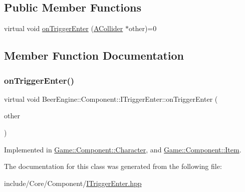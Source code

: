 \subsection*{Public Member Functions}
\begin{DoxyCompactItemize}
\item 
virtual void \mbox{\hyperlink{class_beer_engine_1_1_component_1_1_i_trigger_enter_aab0d007cc2a256bc5aa542cd7dfdeef0}{on\+Trigger\+Enter}} (\mbox{\hyperlink{class_beer_engine_1_1_component_1_1_a_collider}{A\+Collider}} $\ast$other)=0
\end{DoxyCompactItemize}


\subsection{Member Function Documentation}
\mbox{\label{class_beer_engine_1_1_component_1_1_i_trigger_enter_aab0d007cc2a256bc5aa542cd7dfdeef0}} 
\subsubsection{\texorpdfstring{on\+Trigger\+Enter()}{onTriggerEnter()}}
{\footnotesize\ttfamily virtual void Beer\+Engine\+::\+Component\+::\+I\+Trigger\+Enter\+::on\+Trigger\+Enter (\begin{DoxyParamCaption}\item[{\mbox{\hyperlink{class_beer_engine_1_1_component_1_1_a_collider}{A\+Collider}} $\ast$}]{other }\end{DoxyParamCaption})\hspace{0.3cm}{\ttfamily [pure virtual]}}



Implemented in \mbox{\hyperlink{class_game_1_1_component_1_1_character_a69ff22151cf9599aab5cbe6929505c8e}{Game\+::\+Component\+::\+Character}}, and \mbox{\hyperlink{class_game_1_1_component_1_1_item_ae5369b261c5d6212de4b3f21ce02c672}{Game\+::\+Component\+::\+Item}}.



The documentation for this class was generated from the following file\+:\begin{DoxyCompactItemize}
\item 
include/\+Core/\+Component/\mbox{\hyperlink{_i_trigger_enter_8hpp}{I\+Trigger\+Enter.\+hpp}}\end{DoxyCompactItemize}
